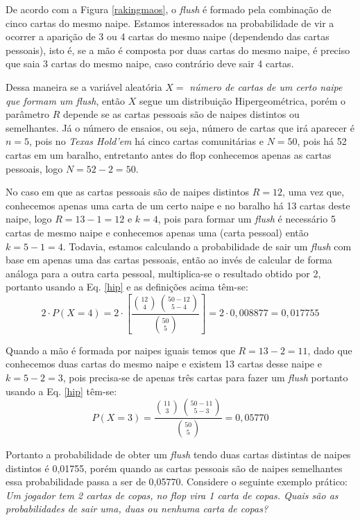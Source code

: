\documentclass[
	12pt,				%
	oneside,			%
	a4paper,			%
	chapter=TITLE,		%
	section=TITLE,		%
	subsection=Title,	%
	subsubsection=Title,%
	brazil,				%
	]{abntex2}
\begin{document}
De acordo com a Figura \ref{rakingmaos}, o \textit{flush} é formado pela combinação de cinco cartas do mesmo naipe. Estamos interessados na probabilidade de vir a ocorrer a aparição de 3 ou 4 cartas do mesmo naipe (dependendo das cartas pessoais), isto é, se a mão é composta por duas cartas do mesmo naipe, é preciso que saia 3 cartas do mesmo naipe, caso contrário deve sair 4 cartas.

Dessa maneira se a variável aleatória $X = $ \textit{número de cartas de um certo naipe que formam um flush}, então $X$ segue um distribuição Hipergeométrica, porém o parâmetro $R$ depende se as cartas pessoais são de naipes distintos ou semelhantes. Já o número de ensaios, ou seja, número de cartas que irá aparecer é $n = 5$, pois no \textit{Texas Hold'em} há cinco cartas comunitárias e $N = 50$, pois há 52 cartas em um baralho, entretanto antes do flop conhecemos apenas as cartas pessoais, logo $N = 52 - 2 = 50$. 


No caso em que as cartas pessoais são de naipes distintos $R = 12$, uma vez que, conhecemos apenas uma carta de um certo naipe e no baralho há 13 cartas deste naipe, logo $R = 13 - 1 = 12$ e $k = 4$, pois para formar um \textit{flush} é necessário 5 cartas de mesmo naipe e conhecemos apenas uma (carta pessoal) então $k = 5 - 1 = 4$. Todavia, estamos calculando a probabilidade de sair um \textit{flush} com base em apenas uma das cartas pessoais, então ao invés de calcular de forma análoga para a outra carta pessoal, multiplica-se o resultado obtido por 2, portanto usando a Eq. \ref{hip} e as definições acima têm-se:
\begin{equation}
2\cdot P(X = 4) = 2\cdot\left[\dfrac{\binom{12}{4}\,\binom{50 - 12}{5 - 4}}{\binom{50}{5}}\right] = 2\cdot0,008877 = 0,017755
\end{equation}

Quando a mão é formada por naipes iguais temos que $R = 13 - 2 =11$, dado que conhecemos duas cartas do mesmo naipe e existem 13 cartas desse naipe e $k = 5 - 2 = 3$, pois precisa-se de apenas três cartas para fazer um \textit{flush} portanto usando a Eq. \ref{hip} têm-se: 
\begin{equation}
P(X = 3) = \dfrac{\binom{11}{3}\,\binom{50 - 11}{5 - 3}}{\binom{50}{5}} = 0,05770
\end{equation}

Portanto a probabilidade de obter um \textit{flush} tendo duas cartas distintas de naipes distintos é 0,01755, porém quando as cartas pessoais são de naipes semelhantes essa probabilidade passa a ser de 0,05770. 
\newpage
Considere o seguinte exemplo prático:\\
\textit{Um jogador tem 2 cartas de copas, no flop vira 1 carta de copas. Quais são as probabilidades de sair uma, duas ou nenhuma carta de copas?} %
 
\end{document}
